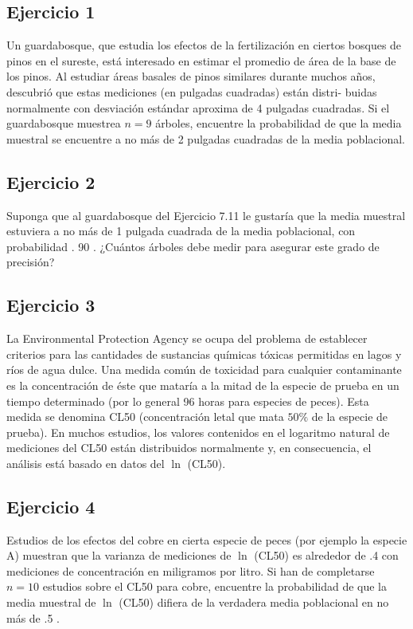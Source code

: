 \documentclass[
]{article}
\begin{document}
\subsection{Ejercicio 1}\label{ejercicio-1-1}

Un guardabosque, que estudia los efectos de la fertilización en ciertos bosques de pinos en el sureste, está interesado en estimar el promedio de área de la base de los pinos. Al estudiar áreas basales de pinos similares durante muchos años, descubrió que estas mediciones (en pulgadas cuadradas) están distri-
buidas normalmente con desviación estándar aproxima de 4 pulgadas cuadradas. Si el guardabosque muestrea \(n=9\) árboles, encuentre la probabilidad de que la media muestral se encuentre a no más de 2 pulgadas cuadradas de la media poblacional.

\subsection{Ejercicio 2}\label{ejercicio-2-1}

Suponga que al guardabosque del Ejercicio 7.11 le gustaría que la media muestral estuviera a no más de 1 pulgada cuadrada de la media poblacional, con probabilidad . 90 . ¿Cuántos árboles debe medir para asegurar este grado de precisión?

\subsection{Ejercicio 3}\label{ejercicio-3-1}

La Environmental Protection Agency se ocupa del problema de establecer criterios para las cantidades de sustancias químicas tóxicas permitidas en lagos y ríos de agua dulce. Una medida común de toxicidad para cualquier contaminante es la concentración de éste que mataría a la mitad de la especie de prueba en un tiempo determinado (por lo general 96 horas para especies de peces). Esta medida se denomina CL50 (concentración letal que mata \(50 \%\) de la especie de prueba). En muchos estudios, los valores contenidos en el logaritmo natural de mediciones del CL50 están distribuidos normalmente y, en consecuencia, el análisis está basado en datos del \(\ln\) (CL50).

\subsection{Ejercicio 4}\label{ejercicio-4-1}

Estudios de los efectos del cobre en cierta especie de peces (por ejemplo la especie A) muestran que la varianza de mediciones de \(\ln\) (CL50) es alrededor de .4 con mediciones de concentración en miligramos por litro. Si han de completarse \(n=10\) estudios sobre el CL50 para cobre, encuentre la probabilidad de que la media muestral de \(\ln\) (CL50) difiera de la verdadera media poblacional en no más de .5 .
\end{document}
